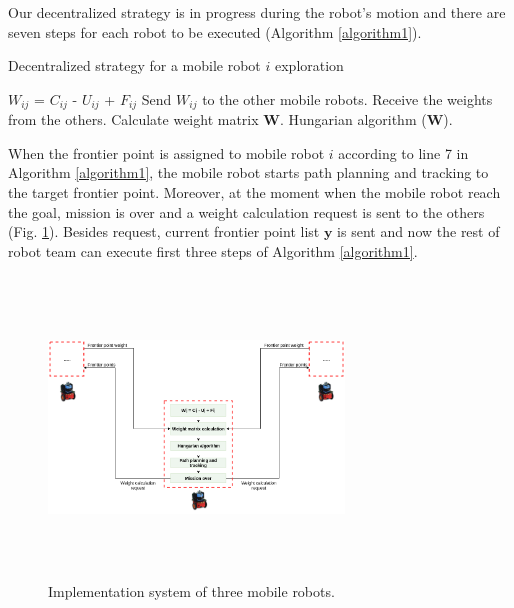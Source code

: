\documentclass[letterpaper, 10 pt, conference]{ieeeconf}  %
\begin{document}
Our decentralized strategy is in progress during the robot's motion and there are seven steps for each robot to be executed (Algorithm \ref{algorithm1}).    

\begin{algorithm}[h!]
\caption{Decentralized strategy for a mobile robot $i$ exploration}
\label{algorithm1}
\begin{algorithmic}[1]
\State\hspace{\algorithmicindent} $W_{ij}$ = $C_{ij}$ - $U_{ij}$ + $F_{ij}$
\State\hspace{\algorithmicindent} Send $W_{ij}$ to the other mobile robots.
\State \hspace{\algorithmicindent} Receive the weights from the others.
\State \hspace{\algorithmicindent} Calculate weight matrix $\boldsymbol{W}$.
\State \hspace{\algorithmicindent} Hungarian algorithm ($\boldsymbol{W}$).
\EndFor
\end{algorithmic}
\end{algorithm}

When the frontier point is assigned to mobile robot $i$ according to line 7 in Algorithm \ref{algorithm1}, the mobile robot starts path planning and tracking to the target frontier point. Moreover, at the moment when the mobile robot reach the goal, mission is over and a weight calculation request is sent to the others (Fig. \ref{fig:sustav3}). Besides request, current frontier point list $\boldsymbol{y}$ is sent and now the rest of robot team can execute first three steps of Algorithm \ref{algorithm1}.    

\begin{figure}[t!]
    \centering\includegraphics[width=0.7\textwidth,height=8cm]{structure.png}
	\caption{Implementation system of three mobile robots.}
    \label{fig:sustav3}
\end{figure}
\end{document}
